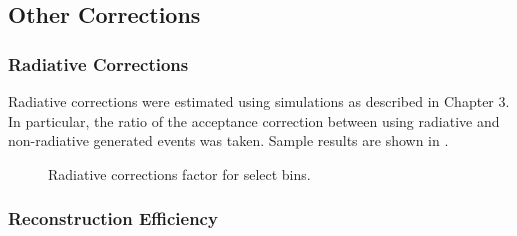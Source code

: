 \subsection{Other Corrections}

    \subsubsection*{Radiative Corrections}

    Radiative corrections were estimated using simulations as described in Chapter 3. In particular, the ratio of the acceptance correction between using radiative and non-radiative generated events was taken. Sample results are shown in . 
    
    \begin{figure}[H]
    \centering

    \hfill

    \caption[Sample of Radiative Corrections ]{Radiative corrections factor for select bins.}\label{fig:radcorr}
\end{figure}

    \subsubsection*{Reconstruction Efficiency}

